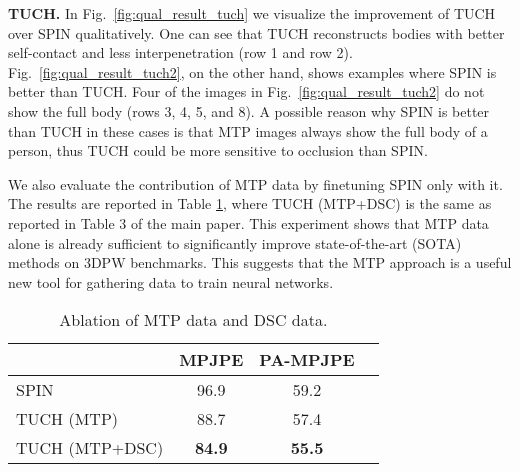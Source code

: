 \documentclass[final]{cvpr}
\theoremstyle{definition}
\begin{document}
\textbf{TUCH.} 
In Fig.~\ref{fig:qual_result_tuch} we visualize the improvement of TUCH over SPIN qualitatively. One can see that TUCH reconstructs bodies with better self-contact and less interpenetration (row 1 and row 2).
Fig.~\ref{fig:qual_result_tuch2}, on the other hand, shows examples where SPIN is better than TUCH. Four of the images in Fig.~\ref{fig:qual_result_tuch2} do not show the full body (rows 3, 4, 5, and 8). A possible reason why SPIN is better than TUCH in these cases is that MTP images always show the full body of a person, thus TUCH could be more sensitive to occlusion than SPIN. 

We also evaluate the contribution of MTP data by finetuning SPIN only
with it. 
The results are reported in Table \ref{supptab:mtp_only}, where TUCH
(MTP+DSC) is the same as reported in Table 3 of the main paper. This experiment shows
that MTP data alone is already sufficient to significantly improve
state-of-the-art (SOTA) methods on 3DPW benchmarks.
This suggests that the MTP approach is a useful new tool for gathering
data to train neural networks. 


\begin{table}
	\begin{center}
		\setlength{\extrarowheight}{2pt}
		\begin{tabular}{lccc}
			\toprule[1pt]
			&   MPJPE  & PA-MPJPE  \\ 
			\hline
			SPIN & 96.9 & 59.2 \\
			TUCH (MTP)  &  88.7         & 57.4         \\
			TUCH (MTP+DSC)  &  \textbf{84.9}         & \textbf{55.5}         \\
			\bottomrule[1pt]
		\end{tabular}
	\end{center}
	\caption{Ablation of MTP data and DSC data.}
	\label{supptab:mtp_only}
\end{table}
\end{document}

